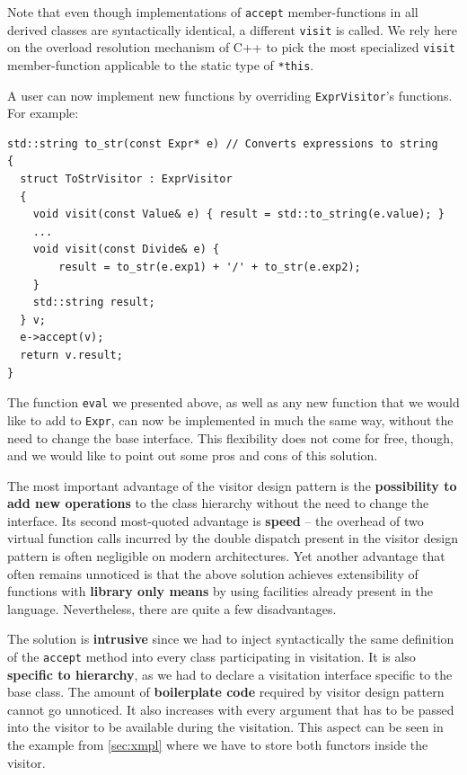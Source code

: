 \documentclass[preprint]{sigplanconf}
\makeatletter
\DeclareRobustCommand{\code}[1]{{\lstinline[breaklines=false,escapechar=@]{#1}}}
\makeatother
\begin{document}
\noindent
Note that even though implementations of \code{accept} member-functions in all 
derived classes are syntactically identical, a different \code{visit} is called. 
We rely here on the overload resolution mechanism of C++ to pick the most 
specialized \code{visit} member-function applicable to the static type of 
\code{*this}.


A user can now implement new functions by overriding \code{ExprVisitor}'s 
functions. For example:

\begin{lstlisting}
std::string to_str(const Expr* e) // Converts expressions to string
{
  struct ToStrVisitor : ExprVisitor
  {
    void visit(const Value& e) { result = std::to_string(e.value); }
    ...
    void visit(const Divide& e) { 
        result = to_str(e.exp1) + '/' + to_str(e.exp2); 
    }
    std::string result;
  } v;
  e->accept(v);
  return v.result;
}
\end{lstlisting}

\noindent
The function \code{eval} we presented above, as well as any new function that we 
would like to add to \code{Expr}, can now be implemented in much the same way, 
without the need to change the base interface. This flexibility does not come for free, 
though, and we would like to point out some pros and cons of this solution.

The most important advantage of the visitor design pattern is the {\bf possibility 
to add new operations} to the class hierarchy without the need to change 
the interface. Its second most-quoted advantage is {\bf speed} -- the 
overhead of two virtual function calls incurred by the double  
dispatch present in the visitor design pattern is often negligible on modern 
architectures. Yet another advantage that often remains unnoticed is that the 
above solution achieves extensibility of functions with {\bf library only means} 
by using facilities already present in the language. Nevertheless, there are 
quite a few disadvantages.

The solution is {\bf intrusive} since we had to inject syntactically the same 
definition of the \code{accept} method into every class participating in visitation. 
It is also {\bf specific to hierarchy}, as we had to declare a visitation 
interface specific to the base class. The amount of {\bf boilerplate code} 
required by visitor design pattern cannot go unnoticed. It also increases with 
every argument that has to be passed into the visitor to be available during the 
visitation. This aspect can be seen in the example from \textsection\ref{sec:xmpl} 
where we have to store both functors inside the visitor.
\end{document}
